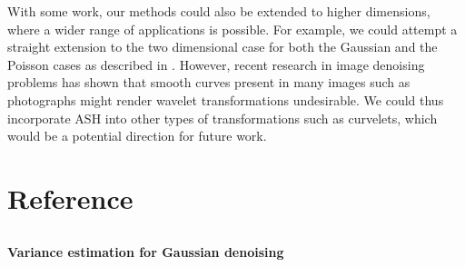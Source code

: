 \documentclass[12pt]{article}
\begin{document}
With some work, our methods could also be extended to higher dimensions, where a wider range of applications is possible. For example, we could attempt a straight extension to the two dimensional case for both the Gaussian and the Poisson cases as described in \cite{Nowak1999Multiscale}. However, recent research in image denoising problems has shown that smooth curves present in many images such as photographs might render wavelet transformations undesirable. We could thus incorporate ASH into other types of transformations such as curvelets, which would be a potential direction for future work.
\newpage
\section{Reference}

\begin{appendices}
\section{}\label{app:var estimation}\bigskip
\textbf{Variance estimation for Gaussian denoising}



\end{appendices}
\end{document}
